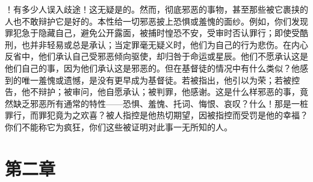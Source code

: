 ！有多少人误入歧途！这无疑是的。然而，彻底邪恶的事物，甚至那些被它裹挟的人也不敢辩护它是好的。本性给一切邪恶披上恐惧或羞愧的面纱。例如，你们发现罪犯急于隐藏自己，避免公开露面，被捕时惶恐不安，受审时否认罪行；即使受酷刑，也并非轻易或总是承认；当定罪毫无疑义时，他们为自己的行为悲伤。在内心反省中，他们承认自己受邪恶倾向驱使，却归咎于命运或星辰。他们不愿承认这是他们自己的事，因为他们承认这是邪恶的。但在基督徒的情况中有什么类似？他感到的唯一羞愧或遗憾，是没有更早成为基督徒。若被指出，他引以为荣；若被控告，他不辩护；被审问，他自愿承认；被判罪，他感谢。这是什么样邪恶的事，竟然缺乏邪恶所有通常的特性——恐惧、羞愧、托词、悔恨、哀叹？什么！那是一桩罪行，而罪犯竟为之欢喜？被人指控是他热切期望，因被指控而受罚是他的幸福？你们不能称它为疯狂，你们这些被证明对此事一无所知的人。\par


\section{第二章}

